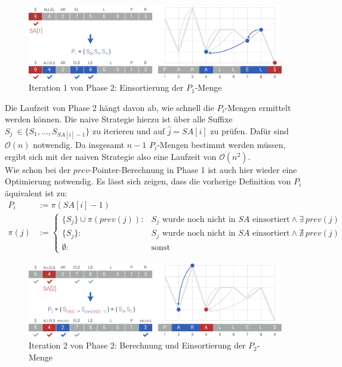 \documentclass[twoside,a4paper,11pt]{article}
\theoremstyle{break}
\begin{document}
\begin{figure}[h]
	\centering
	\includegraphics[width=\linewidth,bb=0 0 1310 386]{./assets/phase2-1.pdf}
	\caption{Iteration 1 von Phase 2: Einsortierung der $P_1$-Menge}
\label{fig:phase2-1}
\end{figure}

Die Laufzeit von Phase 2 hängt davon ab, wie schnell die $P_i$-Mengen ermittelt werden können. Die naive Strategie hierzu ist über alle Suffixe $S_j \ \in \{ S_1, \dots, S_{SA[i] - 1} \}$ zu iterieren und auf $\widehat{j} = SA[i]$ zu prüfen. Dafür sind $\mathcal{O}(n)$ notwendig. Da insgesamt $n - 1$ $P_i$-Mengen bestimmt werden müssen, ergibt sich mit der naiven Strategie also eine Laufzeit von $\mathcal{O}(n^2)$. \\
Wie schon bei der $prev$-Pointer-Berechnung in Phase 1 ist auch hier wieder eine Optimierung notwendig. Es lässt sich zeigen, dass die vorherige Definition von $P_i$ äquivalent ist zu:
\begin{align*}
	P_i &:= \pi(SA[i] - 1) \\
	\pi(j) &:= \begin{cases}
		\{ S_j \} \cup \pi(prev(j)): & S_j \text{ wurde noch nicht in $SA$ einsortiert} \land \exists\ prev(j) \\
		\{ S_j \}: & S_j \text{ wurde noch nicht in $SA$ einsortiert} \land \nexists\ prev(j) \\
		\emptyset: & \text{sonst}
	\end{cases}
\end{align*}
\begin{figure}[h]
	\centering
	\includegraphics[width=\linewidth,bb=0 0 1310 386]{./assets/phase2-2.pdf}
	\caption{Iteration 2 von Phase 2: Berechnung und Einsortierung der $P_2$-Menge}
\label{fig:phase2-2}
\end{figure}
\end{document}
